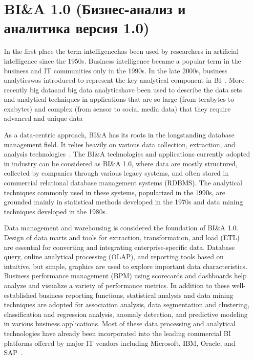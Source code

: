 \section{BI\&A 1.0 (Бизнес-анализ и аналитика версия 1.0)}
In the first place the term intelligencehas been used by researchers in
artificial intelligence since the 1950s. Business intelligence
became a popular term in the business and IT communities
only in the 1990s. In the late 2000s, business analyticswas
introduced to represent the key analytical component in BI~\cite{davenport:2006}. More recently big dataand big data
analyticshave been used to describe the data sets and analytical techniques in applications that are so large (from
terabytes to exabytes) and complex (from sensor to social
media data) that they require advanced and unique data

As a data-centric approach, BI\&A has its roots in the longstanding database management field. It relies heavily on
various data collection, extraction, and analysis technologies~\cite{Chen:2006}. The BI\&A technologies and applications
currently adopted in industry can be considered as BI\&A 1.0,
where data are mostly structured, collected by companies
through various legacy systems, and often stored in commercial relational database management systems (RDBMS). The
analytical techniques commonly used in these systems,
popularized in the 1990s, are grounded mainly in statistical
methods developed in the 1970s and data mining techniques
developed in the 1980s.

Data management and warehousing is considered the foundation of BI\&A 1.0. Design of data marts and tools for
extraction, transformation, and load (ETL) are essential for
converting and integrating enterprise-specific data. Database
query, online analytical processing (OLAP), and reporting
tools based on intuitive, but simple, graphics are used to
explore important data characteristics. Business performance
management (BPM) using scorecards and dashboards help
analyze and visualize a variety of performance metrics. In
addition to these well-established business reporting functions, statistical analysis and data mining techniques are
adopted for association analysis, data segmentation and
clustering, classification and regression analysis, anomaly
detection, and predictive modeling in various business applications. Most of these data processing and analytical technologies have already been incorporated into the leading commercial BI platforms offered by major IT vendors including
Microsoft, IBM, Oracle, and SAP~\cite{Salton:1989}.

